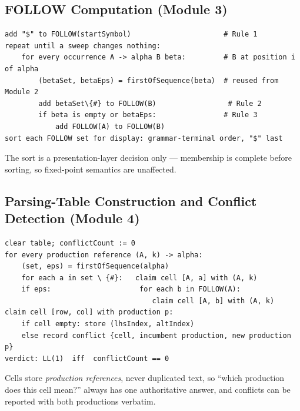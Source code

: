 \documentclass[12pt,a4paper,oneside,openany]{report}
\begin{document}
\subsection{FOLLOW Computation (Module 3)}
\begin{lstlisting}[style=cfg,label=lst:follow,caption={FOLLOW fixed-point algorithm (abridged)}]
add "$" to FOLLOW(startSymbol)                      # Rule 1
repeat until a sweep changes nothing:
    for every occurrence A -> alpha B beta:         # B at position i of alpha
        (betaSet, betaEps) = firstOfSequence(beta)  # reused from Module 2
        add betaSet\{#} to FOLLOW(B)                 # Rule 2
        if beta is empty or betaEps:                # Rule 3
            add FOLLOW(A) to FOLLOW(B)
sort each FOLLOW set for display: grammar-terminal order, "$" last
\end{lstlisting}
The sort is a presentation-layer decision only --- membership is complete
before sorting, so fixed-point semantics are unaffected.

\subsection{Parsing-Table Construction and Conflict Detection (Module 4)}
\begin{lstlisting}[style=cfg,label=lst:table,caption={Table construction (abridged)}]
clear table; conflictCount := 0
for every production reference (A, k) -> alpha:
    (set, eps) = firstOfSequence(alpha)
    for each a in set \ {#}:   claim cell [A, a] with (A, k)
    if eps:                     for each b in FOLLOW(A):
                                   claim cell [A, b] with (A, k)
claim cell [row, col] with production p:
    if cell empty: store (lhsIndex, altIndex)
    else record conflict {cell, incumbent production, new production p}
verdict: LL(1)  iff  conflictCount == 0
\end{lstlisting}
Cells store \emph{production references}, never duplicated text, so
``which production does this cell mean?'' always has one authoritative
answer, and conflicts can be reported with both productions verbatim.
\end{document}
